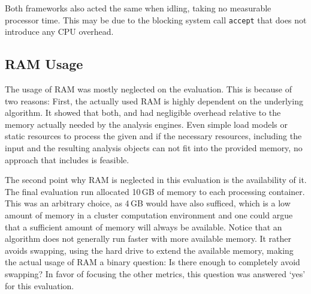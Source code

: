 Both frameworks also acted the same when idling, taking no measurable processor time. This may be due to the blocking system call \lstinline|accept| that does not introduce any CPU overhead.
\subsection{RAM Usage}
The usage of RAM was mostly neglected on the evaluation. This is because of two reasons: First, the actually used RAM is highly dependent on the underlying algorithm. It showed that both, \uimaas{} and \spark{} had negligible overhead relative to the memory actually needed by the analysis engines. Even simple \anens{} load models or static resources to process the given \cas{} and if the necessary resources, including the input \cas{} and the resulting analysis objects can not fit into the provided memory, no approach that includes \uima{} is feasible.

The second point why RAM is neglected in this evaluation is the availability of it. The final evaluation run allocated 10\,GB of memory to each processing container. This was an arbitrary choice, as 4\,GB would have also sufficed, which is a low amount of memory in a cluster computation environment and one could argue that a sufficient amount of memory will always be available. Notice that an algorithm does not generally run faster with more available memory. It rather avoids swapping, using the hard drive to extend the available memory, making the actual usage of RAM a binary question: Is there enough to completely avoid swapping? In favor of focusing the other metrics, this question was answered `yes' for this evaluation.

